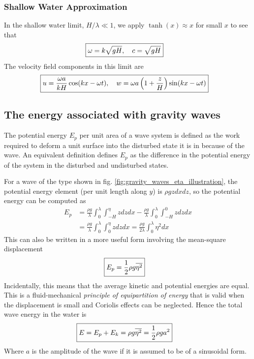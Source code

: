 \documentclass[a4paper, 12pt]{article}
\numberwithin{equation}{subsubsection}
\begin{document}
\subsubsection{Shallow Water Approximation}
In the shallow water limit, $H/\lambda \ll 1$, we apply $\tanh(x) \approx x$ for small $x$ to see that
\begin{align}
	\Aboxed{\omega = k \sqrt{gH}, \quad c = \sqrt{gH}}
\end{align}
The velocity field components in this limit are
\begin{align}
	\Aboxed{u = \frac{\omega a}{kH} \cos(kx - \omega t), \quad w = \omega a \left(1 + \frac{z}{H} \right) \sin(kx - \omega t)}
\end{align}

\subsection{The energy associated with gravity waves}
The potential energy $E_p$ per unit area of a wave system is defined as the work required to deform a unit surface into the disturbed state it is in because of the wave. An equivalent definition defines $E_p$ as the difference in the potential energy of the system in the disturbed and undisturbed states.

For a wave of the type shown in fig. \ref{fig:gravity_waves_eta_illustration}, the potential energy element (per unit length along $y$) is $\rho g z dx dz$, so the potential energy can be computed as
\begin{align}
	E_p &= \frac{\rho g}{\lambda} \int_0^\lambda \int_{-H}^\eta z dz dx - \frac{\rho g}{\lambda} \int_0^\lambda \int_{-H}^0 z dz dx \\
	&= \frac{\rho g}{\lambda} \int_0^\lambda \int_0^\eta z dz dx = \frac{\rho g}{2 \lambda} \int_0^\lambda \eta^2 dx
\end{align}
This can also be written in a more useful form involving the mean-square displacement
\begin{align}
	\Aboxed{E_p = \frac{1}{2} \rho g \overline{\eta^2}}
\end{align}
Incidentally, this means that the average kinetic and potential energies are equal. This is a fluid-mechanical \textit{principle of equipartition of energy} that is valid when the displacement is small and Coriolis effects can be neglected. Hence the total wave energy in the water is
\begin{align}
	\Aboxed{E = E_p + E_k = \rho g \overline{\eta^2} = \frac{1}{2} \rho g a^2}
\end{align}
Where $a$ is the amplitude of the wave if it is assumed to be of a sinusoidal form.
\end{document}
